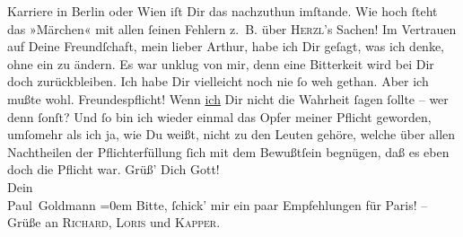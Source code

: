 \begin{ledgroupsized}[t]{13cm}
{{{                  Karriere}}}\label{K_L02674-69h} in Berlin oder Wien iſt Dir das {\pb}nachzuthun imſtande. Wie hoch ſteht das »Märchen« mit allen ſeinen Fehlern z. B. über \textsc{Herzl}’s Sachen! {\dotsfour}\pend
           \pstart
           Im Vertrauen auf Deine Freundſchaft, mein lieber Arthur, habe ich Dir geſagt, was ich
               denke, ohne ein \label{K_L02674-4v}\label{K_L02674-4h} zu ändern. Es war unklug von mir, denn eine
               Bitterkeit wird bei Dir doch zurückbleiben. Ich habe Dir vielleicht noch nie ſo weh
               gethan. Aber ich mußte wohl. Freundespflicht! Wenn \uline{ich} Dir nicht die Wahrheit ſagen ſollte – wer  denn ſonſt? Und ſo bin ich wieder einmal das Opfer meiner Pflicht geworden,
               umſomehr als ich ja, wie Du weißt, nicht zu den Leuten gehöre, welche über allen
               Nachtheilen der Pflichterfüllung ſich mit dem Bewußtſein begnügen, daß es eben doch
               die Pflicht war.\pend
           \pstart
           Grüß’ Dich Gott!{\\[\baselineskip]}Dein{\\[\baselineskip]}\spacefill\mbox{Paul Goldmann}\pend
           \leftskip=0em{}\pstart
           \noindent{}Bitte, ſchick’ mir ein paar Empfehlungen für Paris! – Grüße an \textsc{Richard}, \textsc{Loris} und \textsc{Kapper}.\pend
           
         
         \endnumbering{}\end{ledgroupsized}  \newcommand{\dateiname}{L02674}\newcommand{\titel}{Paul Goldmann an Arthur Schnitzler, 12. 12. [1891]}\newcommand{\editorInnen}{Martin Anton Müller und Laura Untner}
      